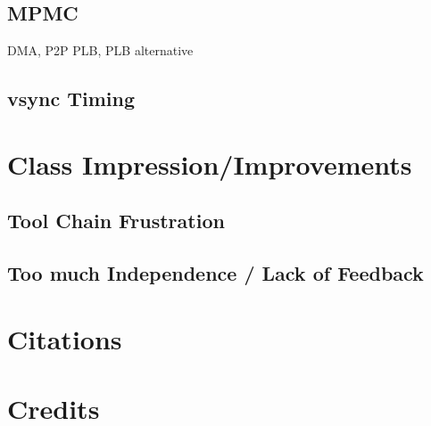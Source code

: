 \documentclass[letterpaper,10pt]{article}
\begin{document}
\subsection{MPMC}
DMA, P2P PLB, PLB alternative

\subsection{vsync Timing}

\section{Class Impression/Improvements}

\subsection{Tool Chain Frustration}
\subsection{Too much Independence / Lack of Feedback}

\section{Citations}


\section{Credits}





\end{document}
